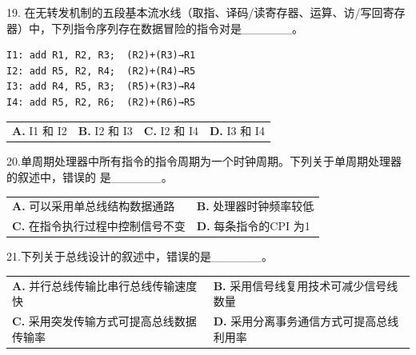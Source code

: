 \documentclass[UTF8,11pt]{ctexart}
\begin{document}
19. 在无转发机制的五段基本流水线（取指、译码/读寄存器、运算、访/写回寄存器）中，下列指令序列存在数据冒险的指令对是\_\_\_\_\_\_。


\begin{Verbatim}[breaklines,breakanywhere,fontsize=\small]
I1: add R1, R2, R3;  (R2)+(R3)→R1
I2: add R5, R2, R4;  (R2)+(R4)→R5
I3: add R4, R5, R3;  (R5)+(R3)→R4
I4: add R5, R2, R6;  (R2)+(R6)→R5
\end{Verbatim}

\begin{center}\begin{tabular}{>{\raggedright\arraybackslash}p{\dimexpr(\linewidth-8\tabcolsep)/4\relax}>{\raggedright\arraybackslash}p{\dimexpr(\linewidth-8\tabcolsep)/4\relax}>{\raggedright\arraybackslash}p{\dimexpr(\linewidth-8\tabcolsep)/4\relax}>{\raggedright\arraybackslash}p{\dimexpr(\linewidth-8\tabcolsep)/4\relax}}
\textbf{A.} I1 和 I2 & \textbf{B.} I2 和 I3 & \textbf{C.} I2 和 I4 & \textbf{D.} I3 和 I4\\[.35em]\end{tabular}\end{center}

20.单周期处理器中所有指令的指令周期为一个时钟周期。下列关于单周期处理器的叙述中，错误的 是\_\_\_\_\_\_。


\begin{center}\begin{tabular}{>{\raggedright\arraybackslash}p{\dimexpr(\linewidth-4\tabcolsep)/2\relax}>{\raggedright\arraybackslash}p{\dimexpr(\linewidth-4\tabcolsep)/2\relax}}
\textbf{A.} 可以采用单总线结构数据通路 & \textbf{B.} 处理器时钟频率较低\\[.35em]
\textbf{C.} 在指令执行过程中控制信号不变 & \textbf{D.} 每条指令的CPI 为1\\[.35em]\end{tabular}\end{center}

21.下列关于总线设计的叙述中，错误的是\_\_\_\_\_\_。


\begin{center}\begin{tabular}{>{\raggedright\arraybackslash}p{\dimexpr(\linewidth-4\tabcolsep)/2\relax}>{\raggedright\arraybackslash}p{\dimexpr(\linewidth-4\tabcolsep)/2\relax}}
\textbf{A.} 并行总线传输比串行总线传输速度快 & \textbf{B.} 采用信号线复用技术可减少信号线数量\\[.35em]
\textbf{C.} 采用突发传输方式可提高总线数据传输率 & \textbf{D.} 采用分离事务通信方式可提高总线利用率\\[.35em]\end{tabular}\end{center}
\end{document}
